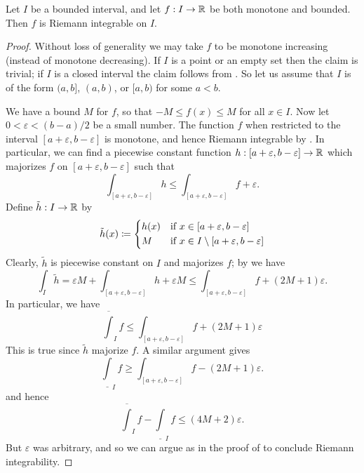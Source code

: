 \begin{cor}\label{i:11.6.3}
  Let \(I\) be a bounded interval, and let \(f : I \to \mathbb{R}\) be both monotone and bounded.
  Then \(f\) is Riemann integrable on \(I\).
\end{cor}

\begin{proof}
  Without loss of generality we may take \(f\) to be monotone increasing (instead of monotone decreasing).
  If \(I\) is a point or an empty set then the claim is trivial;
  if \(I\) is a closed interval the claim follows from .
  So let us assume that \(I\) is of the form \((a, b]\), \((a, b)\), or \([a, b)\) for some \(a < b\).

  We have a bound \(M\) for \(f\), so that \(-M \leq f(x) \leq M\) for all \(x \in I\).
  Now let \(0 < \varepsilon < (b - a) / 2\) be a small number.
  The function \(f\) when restricted to the interval \([a + \varepsilon, b - \varepsilon]\) is monotone, and hence Riemann integrable by .
  In particular, we can find a piecewise constant function \(h : [a + \varepsilon, b - \varepsilon] \to \mathbb{R}\) which majorizes \(f\) on \([a + \varepsilon, b - \varepsilon]\) such that
  \[
    \int_{[a + \varepsilon, b - \varepsilon]} h \leq \int_{[a + \varepsilon, b - \varepsilon]} f + \varepsilon.
  \]
  Define \(\tilde{h} : I \to \mathbb{R}\) by
  \[
    \tilde{h}(x) \coloneqq \begin{dcases}
      h(x) & \text{if } x \in [a + \varepsilon, b - \varepsilon]             \\
      M    & \text{if } x \in I \setminus [a + \varepsilon, b - \varepsilon]
    \end{dcases}
  \]
  Clearly, \(\tilde{h}\) is piecewise constant on \(I\) and majorizes \(f\);
  by  we have
  \[
    \int_I \tilde{h} = \varepsilon M + \int_{[a + \varepsilon, b - \varepsilon]} h + \varepsilon M \leq \int_{[a + \varepsilon, b - \varepsilon]} f + (2M + 1) \varepsilon.
  \]
  In particular, we have
  \[
    \overline{\int}_I f \leq \int_{[a + \varepsilon, b - \varepsilon]} f + (2M + 1) \varepsilon
  \]
  This is true since \(\tilde{h}\) majorize \(f\).
  A similar argument gives
  \[
    \underline{\int}_I f \geq \int_{[a + \varepsilon, b - \varepsilon]} f - (2M + 1) \varepsilon.
  \]
  and hence
  \[
    \overline{\int}_I f - \underline{\int}_I f \leq (4M + 2) \varepsilon.
  \]
  But \(\varepsilon\) was arbitrary, and so we can argue as in the proof of  to conclude Riemann integrability.
\end{proof}

